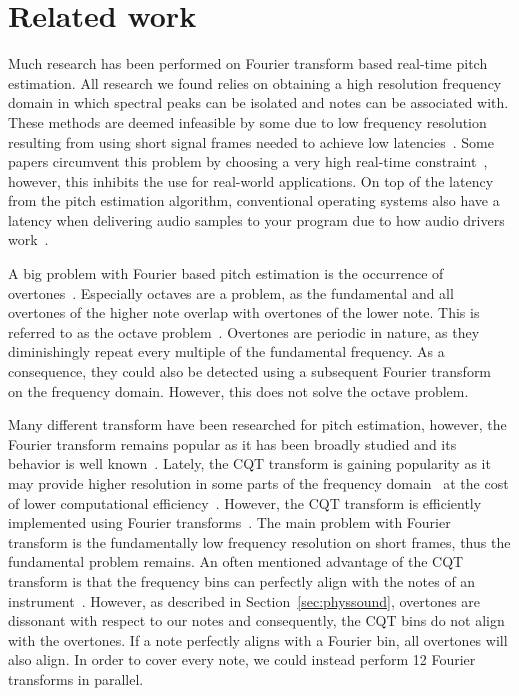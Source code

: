 \documentclass[a4paper,10pt,twocolumn]{article}
\begin{document}
\section{Related work}  \label{sec:related}
Much research has been performed on Fourier transform based real-time pitch estimation. All research we found relies on obtaining a high resolution frequency domain in which spectral peaks can be isolated and notes can be associated with. These methods are deemed infeasible by some due to low frequency resolution resulting from using short signal frames needed to achieve low latencies~\cite{fourierlimit}. %
Some papers circumvent this problem by choosing a very high real-time constraint~\cite{sloomboi, sloomboi2}, however, this inhibits the use for real-world applications. On top of the latency from the pitch estimation algorithm, conventional operating systems also have a latency when delivering audio samples to your program due to how audio drivers work~\cite{oslatency}.

A big problem with Fourier based pitch estimation is the occurrence of overtones~\cite{oud}. Especially octaves are a problem, as the fundamental and all overtones of the higher note overlap with overtones of the lower note. This is referred to as the octave problem~\cite{octave}. Overtones are periodic in nature, as they diminishingly repeat every multiple of the fundamental frequency. As a consequence, they could also be detected using a subsequent Fourier transform~\cite{doublefourier} on the frequency domain. However, this does not solve the octave problem.

Many different transform have been researched for pitch estimation, however, the Fourier transform remains popular as it has been broadly studied and its behavior is well known~\cite{survey}. Lately, the CQT transform is gaining popularity as it may provide higher resolution in some parts of the frequency domain~\cite{cqtres} at the cost of lower computational efficiency~\cite{cqtslow}. However, the CQT transform is efficiently implemented using Fourier transforms~\cite{cqtfft}. The main problem with Fourier transform is the fundamentally low frequency resolution on short frames, thus the fundamental problem remains. An often mentioned advantage of the CQT transform is that the frequency bins can perfectly align with the notes of an instrument~\cite{cqtalign}. However, as described in Section~\ref{sec:physsound}, overtones are dissonant with respect to our notes and consequently, the CQT bins do not align with the overtones. If a note perfectly aligns with a Fourier bin, all overtones will also align. In order to cover every note, we could instead perform 12 Fourier transforms in parallel.%
\end{document}
